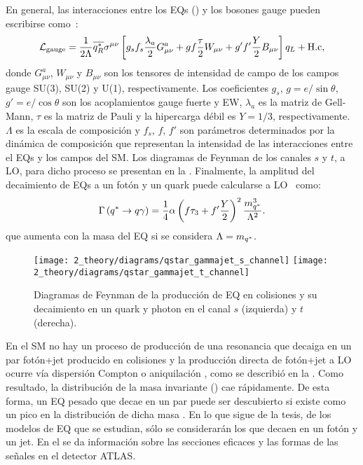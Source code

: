 En general, las interacciones entre los \acp{EQ} (\qstar) y los bosones gauge pueden escribirse como~\cite{Zhan_Li_Liu_Li-2016}:
\begin{equation}
    \mathcal{L}_{\text{gauge}} = 
    \frac{1}{2\Lambda}
    \overline{q^{*}_R}
    \sigma^{\mu\nu}
    \left[
        g_s f_s \frac{\lambda_a}{2} G_{\mu\nu}^a +
        g f \frac{\tau}{2} W_{\mu\nu} +
        g' f' \frac{Y}{2} B_{\mu\nu}
    \right]
    q_L
    + \text{H.c},
\end{equation}
donde \(G_{\mu\nu}^a\), \(W_{\mu\nu}\) y \(B_{\mu\nu}\) son los tensores de intensidad de campo de los campos gauge SU(3), SU(2) y U(1), respectivamente. Los coeficientes \(g_s\), \(g = e / \sin \theta\), \(g' = e / \cos \theta\) son los acoplamientos gauge fuerte y \ac{EW}, \(\lambda_a\) es la matriz de Gell-Mann, \(\tau\) es la matriz de Pauli y la hipercarga débil es \(Y = 1/3\), respectivamente. \(\Lambda\) es la escala de composición y \(f_s, \, f, \, f'\) son parámetros determinados por la dinámica de composición que representan la intensidad de las interacciones entre el \acp{EQ} y los campos del \ac{SM}. Los diagramas de Feynman de los canales \(s\) y \(t\), a \ac{LO}, para dicho proceso se presentan en la \Fig{\ref{fig:theory:bsm:diagrams}}. Finalmente, la amplitud del decaimiento de \acp{EQ} a un fotón y un quark puede calcularse a \ac{LO}~\cite{Zhan_Li_Liu_Li-2016} como:
\begin{equation}
    \Gamma\left(q^{*} \rightarrow q \gamma\right) =
    \frac{1}{4}
    \alpha
    \left(f \tau_3 + f' \frac{Y}{2}\right)^2
    \frac{m_{q^*}^3}{\Lambda^2}.
\end{equation}
que aumenta con la masa \mq del \ac{EQ} si se considera \(\Lambda = m_{q^*}\).


\begin{figure}[ht!]
    \centering
    \texttt{[image: 2\_theory/diagrams/qstar\_gammajet\_s\_channel]}
    \hspace{1cm}
    \texttt{[image: 2\_theory/diagrams/qstar\_gammajet\_t\_channel]}
    \caption{Diagramas de Feynman de la producción de \ac{EQ} en colisiones \pp y su decaimiento en un quark y photon en el canal \(s\) (izquierda) y \(t\) (derecha).}
    \label{fig:theory:bsm:diagrams}
\end{figure}


En el \ac{SM} no hay un proceso de producción de una resonancia que decaiga en un par fotón+jet producido en colisiones \pp y la producción directa de fotón+jet a \ac{LO} ocurre vía dispersión Compton o aniquilación \qqbar, como se describió en la \Sect{\ref{subsec:theory:sm:prompt_photon}}. Como resultado, la distribución de la masa invariante \gammajet (\myj) cae rápidamente. De esta forma, un \ac{EQ} pesado que decae en un par \gammajet puede ser descubierto si existe como un pico en la distribución de dicha masa \myj. En lo que sigue de la tesis, de los modelos de \ac{EQ} que se estudian, sólo se considerarán los que decaen en un fotón y un jet. En el \Ch{\ref{ch:samples}} se da información sobre las secciones eficaces y las formas de las señales en el detector \ac{ATLAS}.

